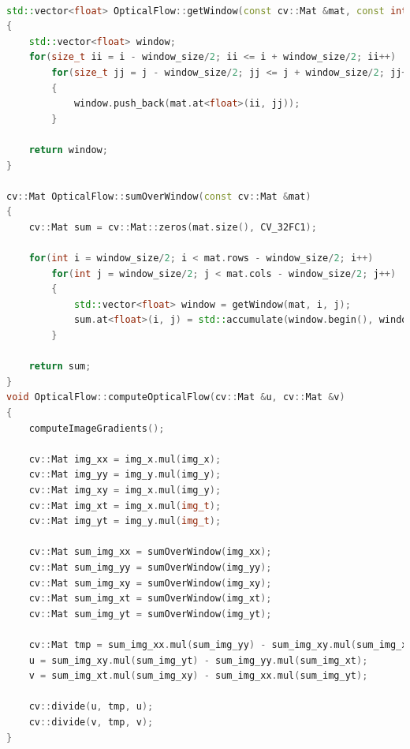 \documentclass[a4paper,11]{article}
\begin{document}
  \begin{lstlisting}[language=C++]
  
std::vector<float> OpticalFlow::getWindow(const cv::Mat &mat, const int &i, const int &j)
{
	std::vector<float> window;
	for(size_t ii = i - window_size/2; ii <= i + window_size/2; ii++)
		for(size_t jj = j - window_size/2; jj <= j + window_size/2; jj++)
		{
			window.push_back(mat.at<float>(ii, jj));
		}

	return window;
}

cv::Mat OpticalFlow::sumOverWindow(const cv::Mat &mat)
{
    cv::Mat sum = cv::Mat::zeros(mat.size(), CV_32FC1);
    
    for(int i = window_size/2; i < mat.rows - window_size/2; i++)
        for(int j = window_size/2; j < mat.cols - window_size/2; j++)
        {
            std::vector<float> window = getWindow(mat, i, j);
            sum.at<float>(i, j) = std::accumulate(window.begin(), window.end(), 0.0);
        }
        
    return sum;        
}
void OpticalFlow::computeOpticalFlow(cv::Mat &u, cv::Mat &v)
{
    computeImageGradients();
    
    cv::Mat img_xx = img_x.mul(img_x);
    cv::Mat img_yy = img_y.mul(img_y);
    cv::Mat img_xy = img_x.mul(img_y);
    cv::Mat img_xt = img_x.mul(img_t);
    cv::Mat img_yt = img_y.mul(img_t);
    
    cv::Mat sum_img_xx = sumOverWindow(img_xx);
    cv::Mat sum_img_yy = sumOverWindow(img_yy);
    cv::Mat sum_img_xy = sumOverWindow(img_xy);
    cv::Mat sum_img_xt = sumOverWindow(img_xt);
    cv::Mat sum_img_yt = sumOverWindow(img_yt);
    
    cv::Mat tmp = sum_img_xx.mul(sum_img_yy) - sum_img_xy.mul(sum_img_xy);
    u = sum_img_xy.mul(sum_img_yt) - sum_img_yy.mul(sum_img_xt);
    v = sum_img_xt.mul(sum_img_xy) - sum_img_xx.mul(sum_img_yt);
    
    cv::divide(u, tmp, u);
    cv::divide(v, tmp, v);
}
  \end{lstlisting}
  \vspace{1em}
  
\end{document}
